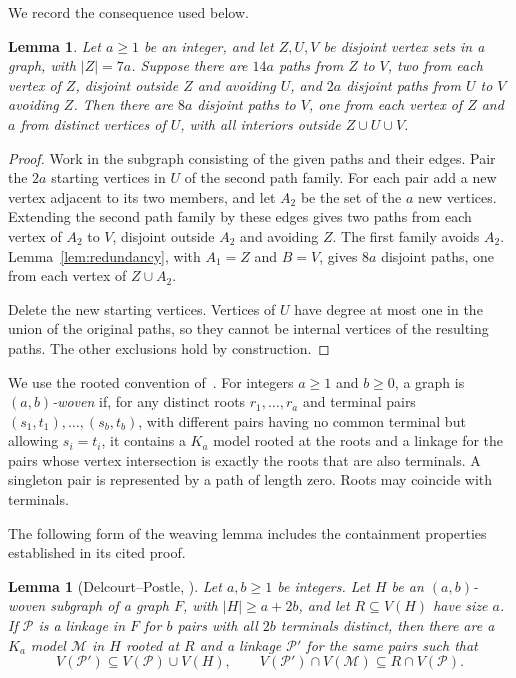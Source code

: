 \documentclass[11pt]{article}
\newtheorem{lemma}[theorem]{Lemma}
\begin{document}
We record the consequence used below.
\begin{lemma}\label{lem:fan}
Let $a\ge1$ be an integer, and let $Z,U,V$ be disjoint vertex sets
in a graph, with $|Z|=7a$. Suppose there are $14a$ paths from $Z$ to
$V$, two from each vertex of $Z$, disjoint outside $Z$ and avoiding
$U$, and $2a$ disjoint paths from $U$ to $V$ avoiding $Z$.
Then there are $8a$ disjoint paths to $V$, one from each vertex of
$Z$ and $a$ from distinct vertices of $U$, with all interiors outside
$Z\cup U\cup V$.
\end{lemma}
\begin{proof}
Work in the subgraph consisting of the given paths and their edges.
Pair the $2a$ starting vertices in $U$ of the second path family.
For each pair add a new vertex adjacent to its two members, and let
$A_2$ be the set of the $a$ new vertices. Extending the second path
family by these edges gives two paths from each vertex of $A_2$ to
$V$, disjoint outside $A_2$ and avoiding $Z$. The first family avoids
$A_2$. Lemma~\ref{lem:redundancy}, with $A_1=Z$ and $B=V$, gives
$8a$ disjoint paths, one from each vertex of $Z\cup A_2$.

Delete the new starting vertices. Vertices of $U$ have degree at most one
in the union of the original paths, so they cannot be internal vertices
of the resulting paths. The other exclusions hold by construction.
\end{proof}

We use the rooted convention of~\cite[Definition~5.12]{DP}.
For integers $a\ge1$ and $b\ge0$, a graph is \emph{$(a,b)$-woven} if,
for any distinct roots $r_1,\ldots,r_a$ and terminal pairs
$(s_1,t_1),\ldots,(s_b,t_b)$, with different pairs having no common
terminal but allowing $s_i=t_i$, it contains a $K_a$ model rooted at
the roots and a linkage for the pairs whose vertex intersection is
exactly the roots that are also terminals. A singleton pair is represented
by a path of length zero. Roots may coincide with terminals.

The following form of the weaving lemma includes the containment
properties established in its cited proof.
\begin{lemma}[Delcourt--Postle, {\cite[Lemma~5.15 and its proof]{DP}}]
\label{lem:weave}
Let $a,b\ge1$ be integers. Let $H$ be an $(a,b)$-woven subgraph of a
graph $F$, with $|H|\ge a+2b$, and let $R\subseteq V(H)$ have size
$a$. If $\mathcal P$ is a linkage in $F$ for $b$ pairs with all $2b$
terminals distinct, then there are a $K_a$ model $\mathcal M$ in
$H$ rooted at $R$ and a linkage $\mathcal P'$ for the same pairs such that
\[
 V(\mathcal P')\subseteq V(\mathcal P)\cup V(H),\qquad
 V(\mathcal P')\cap V(\mathcal M)\subseteq R\cap V(\mathcal P).
\]
\end{lemma}
\end{document}
